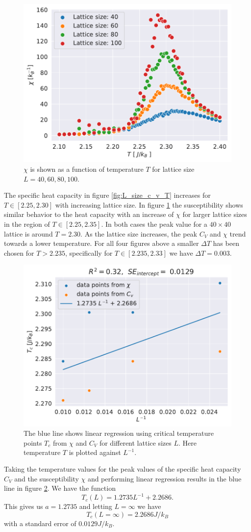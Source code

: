 \documentclass[english,notitlepage,reprint,nofootinbib]{revtex4-1}  %
\begin{document}
\begin{figure}[H]
    \centering
    \includegraphics[width=.5\textwidth]{../figures/L_size_X_T.pdf}
    \caption{$\chi$ is shown as a function of temperature $T$ for lattice size $L= 40, 60,80,100$.}
    \label{fig:L_size_X_T}
\end{figure}
The specific heat capacity in figure \ref{fig:L_size_c_v_T} increases for $T \in [2.25,2.30]$ with increasing lattice size. In figure \ref{fig:L_size_X_T} the susceptibility shows similar behavior to the heat capacity with an increase of $\chi$ for larger lattice sizes in the region of  $T \in [2.25,2.35]$. In both cases the peak value for a $40 \times 40$ lattice is around $T=2.30$. As the lattice size increases, the peak $C_V$ and $\chi$ trend towards a lower temperature. For all four figures above a smaller $\Delta T$ has been chosen for $T > 2.235$, specifically for  $T \in [2.235,2.33]$ we have $\Delta T = 0.003$.

\begin{figure}[H]
    \centering
    \includegraphics[width=.5\textwidth]{../figures/linregress.pdf}
    \caption{The blue line shows linear regression using critical temperature points $T_c$ from $\chi$ and $C_V$ for different lattice sizes $L$. Here temperature $T$ is plotted against $L^{-1}$.}
    \label{fig:linregress}
\end{figure}
Taking the temperature values for the peak values of the specific heat capacity $C_V$ and the susceptibility $\chi$ and performing linear regression results in the blue line in figure \ref{fig:linregress}. We have the function
\begin{equation}
    T_c(L) = 1.2735 L^{-1} + 2.2686.
\end{equation}
This gives us $a=1.2735$ and letting $L=\infty$ we have
\begin{equation}
    T_c(L=\infty) = 2.2686 J/k_B
\end{equation}
with a standard error of $0.0129 J/k_B$.
\end{document}
